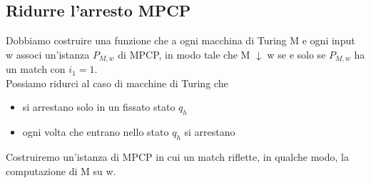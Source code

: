 \subsection{Ridurre l'arresto MPCP}
Dobbiamo costruire una funzione che a ogni macchina di Turing M e ogni input w associ un’istanza $P_{M,w}$ di MPCP, in modo tale che M $\downarrow$ w se e solo se $P_{M,w}$ ha un match con $i_1 = 1$.\\
Possiamo ridurci al caso di macchine di Turing che
\begin{itemize}
    \item si arrestano solo in un fissato stato $q_h$
    
    \item ogni volta che entrano nello stato $q_h$ si arrestano
\end{itemize}
Costruiremo un’istanza di MPCP in cui un match riflette, in qualche modo, la computazione di M su w.
